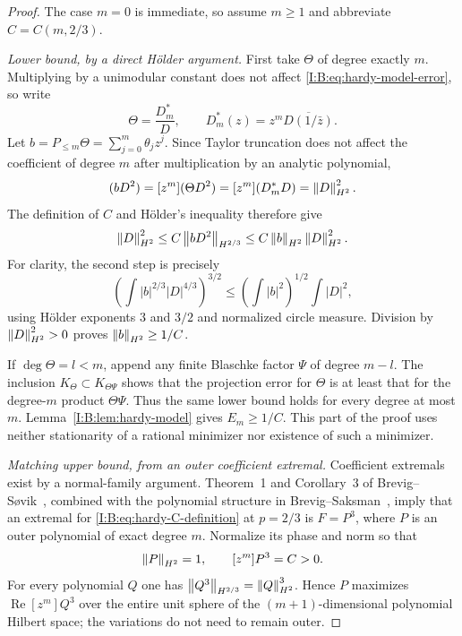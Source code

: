 \begin{proof}
The case $m=0$ is immediate, so assume $m\ge1$ and abbreviate
$C=C(m,2/3)$.

\emph{Lower bound, by a direct H\"older argument.}
First take $\Theta$ of degree exactly $m$.  Multiplying by a unimodular
constant does not affect \eqref{I:B:eq:hardy-model-error}, so write
\[
 \Theta=\frac{D_m^*}{D},\qquad
 D_m^*(z)=z^m\overline{D(1/\bar z)}.
\]
Let $b=P_{\le m}\Theta=\sum_{j=0}^m\theta_jz^j$.  Since Taylor truncation
does not affect the coefficient of degree $m$ after multiplication by an
analytic polynomial,
\begin{equation}
 [z^m](bD^2)=[z^m](\Theta D^2)
 =[z^m](D_m^*D)=\Bnorm{D}_{\BHtwo}^2.
 \label{I:B:eq:hardy-key-coefficient}
\end{equation}
The definition of $C$ and H\"older's inequality therefore give
\begin{equation}
 \left\lVert D\right\rVert_{H^2}^2
 \le C\left\lVert bD^2\right\rVert_{H^{2/3}}
 \le C\left\lVert b\right\rVert_{H^2}\left\lVert D\right\rVert_{H^2}^2.
 \label{I:B:eq:hardy-holder-bound}
\end{equation}
For clarity, the second step is precisely
\[
 \left(\int |b|^{2/3}|D|^{4/3}\right)^{3/2}
 \le\left(\int |b|^2\right)^{1/2}\int |D|^2,
\]
using H\"older exponents $3$ and $3/2$ and normalized circle measure.
Division by $\left\lVert D\right\rVert_{H^2}^2>0$ proves
$\left\lVert b\right\rVert_{H^2}\ge1/C$.

If $\deg\Theta=l<m$, append any finite Blaschke factor $\Psi$ of degree
$m-l$.  The inclusion $K_\Theta\subset K_{\Theta\Psi}$ shows that the
projection error for $\Theta$ is at least that for the degree-$m$ product
$\Theta\Psi$.  Thus the same lower bound holds for every degree at most
$m$.  Lemma~\ref{I:B:lem:hardy-model} gives $E_m\ge1/C$.  This part of the
proof uses neither stationarity of a rational minimizer nor existence of
such a minimizer.

\emph{Matching upper bound, from an outer coefficient extremal.}
Coefficient extremals exist by a normal-family argument.  Theorem~1 and
Corollary~3 of Brevig--S\o vik~\cite{outer2026}, combined with the
polynomial structure in Brevig--Saksman~\cite{brevig2020}, imply that an
extremal for \eqref{I:B:eq:hardy-C-definition} at $p=2/3$ is $F=P^3$, where
$P$ is an outer polynomial of exact degree $m$.  Normalize its phase and
norm so that
\begin{equation}
 \left\lVert P\right\rVert_{H^2}=1,\qquad [z^m]P^3=C>0.
 \label{I:B:eq:hardy-extremal-normalization}
\end{equation}
For every polynomial $Q$ one has
$\left\lVert Q^3\right\rVert_{H^{2/3}}=\left\lVert Q\right\rVert_{H^2}^3$.  Hence $P$ maximizes
$\operatorname{Re}[z^m]Q^3$ over the entire unit sphere of the
$(m+1)$-dimensional polynomial Hilbert space; the variations do not need
to remain outer.


\end{proof}
